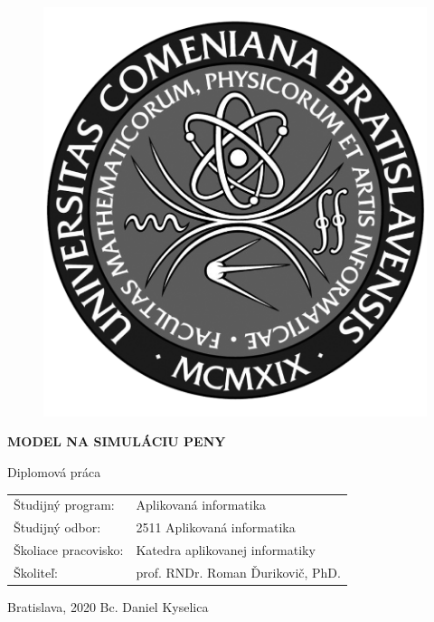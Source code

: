 \documentclass[12pt, a4paper, oneside]{book}
\newcommand\mftitle{Model na simuláciu peny}
\newcommand\mfthesistype{Diplomová práca}
\newcommand\mfauthor{Bc. Daniel Kyselica}
\newcommand\mfadvisor{prof. RNDr. Roman Ďurikovič, PhD.}
\newcommand\mfplacedate{Bratislava, 2020}
\begin{document}
\vfill
\begin{figure}[!hbt]
\begin{center}
\includegraphics{images/logo_fmph_dark}
\label{img:logo_dark}
\end{center}
\end{figure}
\begin{center}
\begin{minipage}{0.8\textwidth}
\centerline{\textbf{\Large\MakeUppercase{\mftitle}}}
\smallskip
\centerline{\mfthesistype}
\end{minipage}
\end{center}
\vfill
\begin{tabular}{l l}
Študijný program: & Aplikovaná informatika\\
Študijný odbor: & 2511 Aplikovaná informatika\\
Školiace pracovisko: & Katedra aplikovanej informatiky\\
Školiteľ: & \mfadvisor
\end{tabular}
\vfill
\noindent
\mfplacedate \hfill
\mfauthor
\eject 

\end{document}
